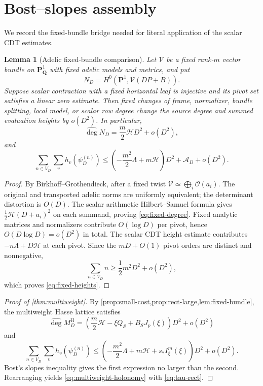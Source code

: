 \documentclass[11pt]{article}
\newtheorem{lemma}[lemma]{Lemma}
\theoremstyle{definition}
\theoremstyle{remark}
\newcommand{\Q}{\mathbf Q}
\newcommand{\calO}{\mathcal O}
\newcommand{\calV}{\mathcal V}
\newcommand{\widehatdeg}{\widehat{\deg}}
\newcommand{\Energy}{\mathscr H}
\newcommand{\LambdaAH}{\Lambda}
\begin{document}
\section{Bost--slopes assembly}\label{sec:bost}

We record the fixed-bundle bridge needed for literal application of the scalar
CDT estimates.

\begin{lemma}[Adelic fixed-bundle comparison]\label{lem:fixed-bundle}
Let $\calV$ be a fixed rank-$m$ vector bundle on $\mathbf P^1_\Q$ with fixed
adelic models and metrics, and put
\[
 N_D=H^0(\mathbf P^1,\calV(DP+B)).
\]
Suppose scalar contraction with a fixed horizontal leaf is injective and its
pivot set satisfies a linear zero estimate.  Then fixed changes of frame,
normalizer, bundle splitting, local model, or scalar row degree change the
source degree and summed evaluation heights by $o(D^2)$.  In particular,
\begin{equation}\label{eq:fixed-degree}
 \widehatdeg N_D=\frac m2\Energy D^2+o(D^2),
\end{equation}
and
\begin{equation}\label{eq:fixed-heights}
 \sum_{n\in V_D}\sum_vh_v(\psi_D^{(n)})
 \le\left(-\frac{m^2}{2}\LambdaAH+m\Energy\right)D^2
 +\mathscr A_D+o(D^2).
\end{equation}
\end{lemma}

\begin{proof}
By Birkhoff--Grothendieck, after a fixed twist
$\calV\simeq\bigoplus_i\calO(a_i)$.  The original and transported adelic norms
are uniformly equivalent; the determinant distortion is $O(D)$.  The scalar
arithmetic Hilbert--Samuel formula gives
$\frac12\Energy(D+a_i)^2$ on each summand, proving
\eqref{eq:fixed-degree}.  Fixed analytic matrices and normalizers contribute
$O(\log D)$ per pivot, hence $O(D\log D)=o(D^2)$ in total.  The scalar CDT
height estimate contributes $-n\LambdaAH+D\Energy$ at each pivot.  Since the
$mD+O(1)$ pivot orders are distinct and nonnegative,
\[
 \sum_{n\in V_D}n\ge\frac12m^2D^2+o(D^2),
\]
which proves \eqref{eq:fixed-heights}.
\end{proof}

\begin{proof}[Proof of \cref{thm:multiweight}]
By \cref{prop:small-cost,prop:rect-large,lem:fixed-bundle}, the multiweight
Hasse lattice satisfies
\[
 \widehatdeg M_D^{\mathrm H}
 =\left(\frac m2\Energy-
 \xi Q_{\mathcal S}+B_{\mathcal S}J_p(\xi)\right)D^2+o(D^2)
\]
and
\[
 \sum_{n\in V_D}\sum_vh_v(\psi_D^{(n)})
 \le\left(-\frac{m^2}{2}\LambdaAH+m\Energy
 +s_*I^m_\xi(\xi)\right)D^2+o(D^2).
\]
Bost's slopes inequality gives the first expression no larger than the
second.  Rearranging yields \eqref{eq:multiweight-holonomy} with
\eqref{eq:tau-rect}.
\end{proof}
\end{document}
